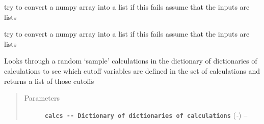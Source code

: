 \documentclass[letterpaper,10pt,english]{sphinxmanual}
\begin{document}

\begin{fulllineitems}
\label{pseudo:pseudo.__cubicInterpolation}
try to convert a numpy array into a list if
this fails assume that the inputs are lists

\end{fulllineitems}


\begin{fulllineitems}
\label{pseudo:pseudo.__cubicInterpolation_onePoint}
try to convert a numpy array into a list if
this fails assume that the inputs are lists

\end{fulllineitems}


\begin{fulllineitems}
\label{pseudo:pseudo.__getCutOffs}
Looks through a random `sample' calculations in the dictionary of dictionaries of calculations
to see which cutoff variables are defined in the set of calculations and returns a list of
those cutoffs
\begin{quote}\begin{description}
\item[{Parameters}] \leavevmode
\textbf{\texttt{calcs -{-} Dictionary of dictionaries of calculations}} (\emph{-}) -- 

\end{description}\end{quote}

\end{fulllineitems}

\end{document}
